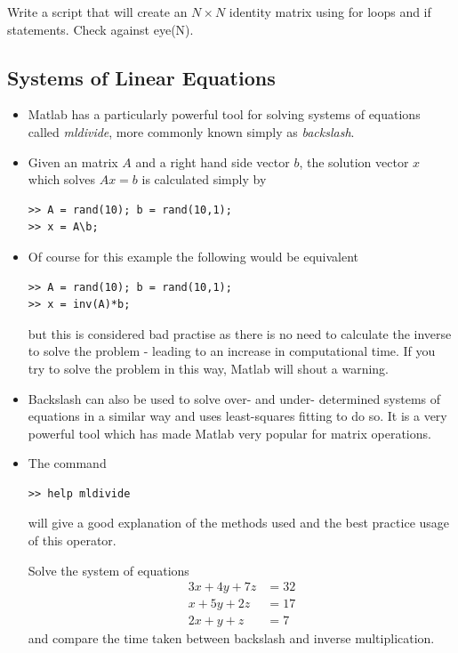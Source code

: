 \documentclass[12pt]{report}
\begin{document}
\begin{tcolorbox}[title=Task - Quick]
	 Write a script that will create an $N \times N$ identity matrix using for loops and if statements. Check against eye(N).
\end{tcolorbox}

\subsection*{Systems of Linear Equations}

\begin{itemize}
\item Matlab has a particularly powerful tool for solving systems of equations called \textit{mldivide}, more commonly known simply as \textit{backslash}.
\item Given an matrix $A$ and a right hand side vector $b$, the solution vector $x$ which solves $Ax = b$ is calculated simply by
\begin{lstlisting}
>> A = rand(10); b = rand(10,1);
>> x = A\b;
\end{lstlisting}
\item Of course for this example the following would be equivalent
\clearpage
\begin{lstlisting}
>> A = rand(10); b = rand(10,1);
>> x = inv(A)*b;
\end{lstlisting}
but this is considered bad practise as there is no need to calculate the inverse to solve the problem - leading to an increase in computational time. If you try to solve the problem in this way, Matlab will shout a warning.
\item Backslash can also be used to solve over- and under- determined systems of equations in a similar way and uses least-squares fitting to do so. It is a very powerful tool which has made Matlab very popular for matrix operations.
\item The command
\begin{lstlisting}
>> help mldivide
\end{lstlisting}
will give a good explanation of the methods used and the best practice usage of this operator.
\begin{tcolorbox}[title=Task]
	Solve the system of equations 
	\begin{align*}
	3x + 4y + 7z &= 32 \\
	x + 5y + 2z &= 17 \\
	2x + y + z &= 7
	\end{align*}
	and compare the time taken between backslash and inverse multiplication.

\end{tcolorbox}
\end{itemize}
\end{document}
